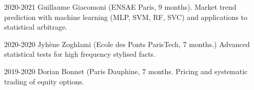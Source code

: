 

\begin{center}
\end{center}
\begin{cvskills}

  \cvskilll
    {2020-2021} %
    {} %
    {Guillaume Giacomoni (ENSAE Paris, 9 months). Market trend prediction with machine learning (MLP, SVM, RF, SVC) and applications to statistical arbitrage.} %

    \cvskilll
    {2020-2020} %
    {}
    {Jyhène Zoghlami (Ecole des Ponts ParisTech, 7 months.) Advanced statistical tests for high frequency stylised facts.}


    \cvskilll
    {2019-2020} %
    {}
    {Dorian Bonnet (Paris Dauphine, 7 months. Pricing and systematic trading of equity options. } %

    
\end{cvskills}



